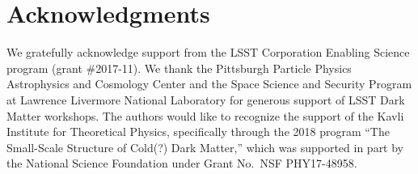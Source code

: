 \chapter*{Acknowledgments}

We gratefully acknowledge support from the LSST Corporation Enabling Science program (grant \#2017-11).
We thank the Pittsburgh Particle Physics Astrophysics and Cosmology Center and the Space Science and Security Program at Lawrence Livermore National Laboratory for generous support of LSST Dark Matter workshops. 
The authors would like to recognize the support of the Kavli Institute for Theoretical Physics, specifically through the 2018 program ``The Small-Scale Structure of Cold(?) Dark Matter,'' which was supported in part by the National Science Foundation under Grant No.\ NSF PHY17-48958.









